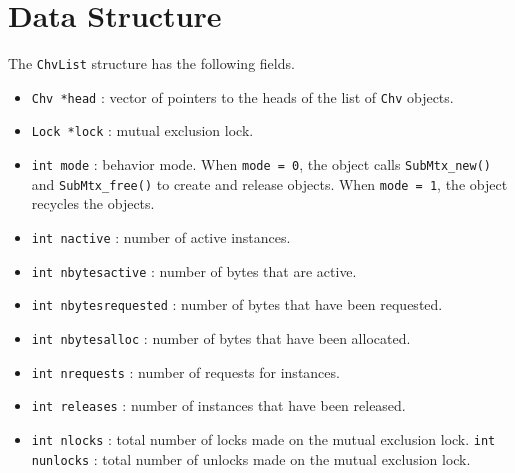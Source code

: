 \par
\section{Data Structure}
\label{section:ChvManager:dataStructure}
\par
\par
The {\tt ChvList} structure has the following fields.
\begin{itemize}
\item
{\tt Chv *head} : 
vector of pointers to the heads of the list of {\tt Chv} objects.
\item
{\tt Lock *lock} : mutual exclusion lock.
\item
{\tt int mode} : behavior mode.
When {\tt mode = 0}, the object calls {\tt SubMtx\_new()}
and {\tt SubMtx\_free()} to create and release objects.
When {\tt mode = 1}, the object recycles the objects.
\item
{\tt int nactive} : 
number of active instances.
\item
{\tt int nbytesactive} : 
number of bytes that are active.
\item
{\tt int nbytesrequested} : 
number of bytes that have been requested.
\item
{\tt int nbytesalloc} : 
number of bytes that have been allocated.
\item
{\tt int nrequests} : 
number of requests for instances.
\item
{\tt int releases} : 
number of instances that have been released.
\item
{\tt int nlocks} : 
total number of locks made on the mutual exclusion lock.
{\tt int nunlocks} : 
total number of unlocks made on the mutual exclusion lock.
\end{itemize}
